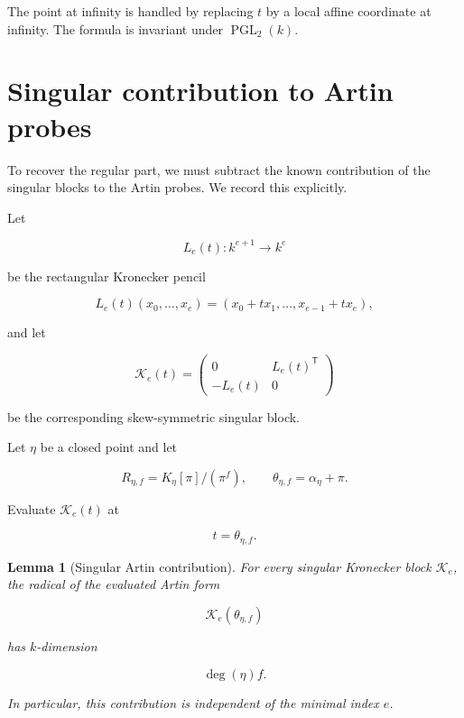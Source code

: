 \documentclass[11pt]{article}
\newtheorem{lemma}[theorem]{Lemma}
\begin{document}
The point at infinity is handled by replacing $t$ by a local affine coordinate at infinity. The formula is invariant under $\operatorname{PGL}_2(k)$.

\section{Singular contribution to Artin probes}

To recover the regular part, we must subtract the known contribution of the singular blocks to the Artin probes. We record this explicitly.

Let

\[
L_e(t):k^{e+1}\to k^e
\]

be the rectangular Kronecker pencil

\[
L_e(t)(x_0,\ldots,x_e)
=
(x_0+t x_1,\ldots,x_{e-1}+t x_e),
\]

and let

\[
\mathcal K_e(t)
=
\begin{pmatrix}
0&L_e(t)^{\mathsf T}\\
-L_e(t)&0
\end{pmatrix}
\]

be the corresponding skew-symmetric singular block.

Let $\eta$ be a closed point and let

\[
R_{\eta,f}=K_\eta[\pi]/(\pi^f),
\qquad
\theta_{\eta,f}=\alpha_\eta+\pi.
\]

Evaluate $\mathcal K_e(t)$ at

\[
t=\theta_{\eta,f}.
\]

\begin{lemma}[Singular Artin contribution]

For every singular Kronecker block $\mathcal K_e$, the radical of the evaluated Artin form

\[
\mathcal K_e(\theta_{\eta,f})
\]

has $k$-dimension

\[
\boxed{
\deg(\eta)f.
}
\]

In particular, this contribution is independent of the minimal index $e$.

\end{lemma}
\end{document}
